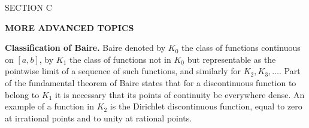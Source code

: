 \newcommand{\ccorrnote}[1]{\footnote{{\fontspec{Noto Serif}\textbf{校勘：}#1}}}

\clearpage
\begin{center}
{\sffamily\color{BellaBlue}\Large SECTION C\par}
\vspace{0.8ex}
{\bfseries\Large MORE ADVANCED TOPICS\par}
\end{center}
\begingroup
\sloppy
\setlength{\emergencystretch}{4em}


\begin{sourcebox}
\textbf{Classification of Baire.} Baire denoted by $K_0$ the class of functions continuous on $[a,b]$, by $K_1$ the class of functions not in $K_0$ but representable as the pointwise limit of a sequence of such functions, and similarly for $K_2,K_3,\ldots$. Part of the fundamental theorem of Baire states that for a discontinuous function to belong to $K_1$ it is necessary that its points of continuity be everywhere dense. An example of a function in $K_2$ is the Dirichlet discontinuous function, equal to zero at irrational points and to unity at rational points.
\end{sourcebox}


